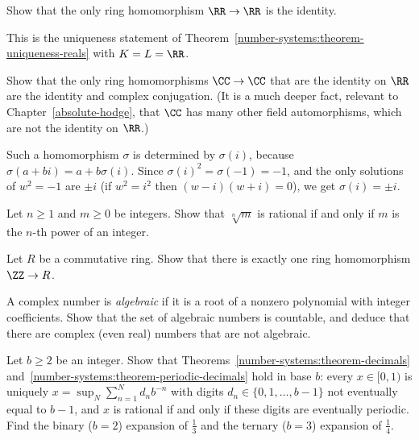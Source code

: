 \begin{exercise}\label{number-systems:exercise-ring-endomorphisms-reals}
Show that the only ring homomorphism $\RR \to \RR$ is the identity.
\end{exercise}

\begin{solution}
This is the uniqueness statement of
Theorem~\ref{number-systems:theorem-uniqueness-reals} with $K = L = \RR$.
\end{solution}

\begin{exercise}\label{number-systems:exercise-automorphisms-complex}
Show that the only ring homomorphisms $\CC \to \CC$ that are the identity on
$\RR$ are the identity and complex conjugation. (It is a much deeper fact,
relevant to Chapter~\ref{absolute-hodge}, that $\CC$ has many other field
automorphisms, which are not the identity on $\RR$.)
\end{exercise}

\begin{solution}
Such a homomorphism $\sigma$ is determined by $\sigma(i)$, because
$\sigma(a + bi) = a + b\sigma(i)$. Since $\sigma(i)^2 = \sigma(-1) = -1$, and the
only solutions of $w^2 = -1$ are $\pm i$ (if $w^2 = i^2$ then $(w - i)(w + i) = 0$),
we get $\sigma(i) = \pm i$.
\end{solution}

\begin{exercise}\label{number-systems:exercise-rational-roots}
Let $n \geq 1$ and $m \geq 0$ be integers. Show that $\sqrt[n]{m}$ is rational if
and only if $m$ is the $n$-th power of an integer.
\end{exercise}

\begin{exercise}\label{number-systems:exercise-integers-initial}
Let $R$ be a commutative ring. Show that there is exactly one ring
homomorphism $\ZZ \to R$.
\end{exercise}

\begin{exercise}\label{number-systems:exercise-algebraic-numbers}
A complex number is \emph{algebraic} if it is a root of a nonzero polynomial
with integer coefficients. Show that the set of algebraic numbers is
countable, and deduce that there are complex (even real) numbers that are not
algebraic.
\end{exercise}

\begin{exercise}\label{number-systems:exercise-decimal-expansions}
Let $b \geq 2$ be an integer. Show that Theorems~\ref{number-systems:theorem-decimals} and~\ref{number-systems:theorem-periodic-decimals} hold in base $b$: every $x \in [0, 1)$ is uniquely
$x = \sup_N\sum_{n=1}^Nd_nb^{-n}$ with digits $d_n \in \{0, 1, \ldots, b - 1\}$ not eventually equal to $b - 1$, and $x$ is rational if and only if these digits are eventually periodic. Find the binary
($b = 2$) expansion of $\frac13$ and the ternary ($b = 3$) expansion of $\frac14$.
\end{exercise}

